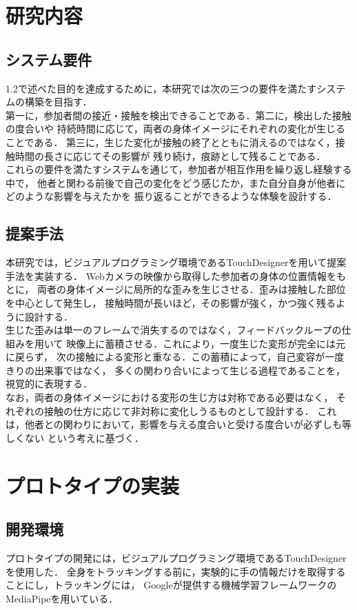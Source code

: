 \chapter{研究内容}
\label{chp:third}

\section{システム要件}

1.2で述べた目的を達成するために，本研究では次の三つの要件を満たすシステムの構築を目指す．\\
第一に，参加者間の接近・接触を検出できることである．第二に，検出した接触の度合いや
持続時間に応じて，両者の身体イメージにそれぞれの変化が生じることである．
第三に，生じた変化が接触の終了とともに消えるのではなく，接触時間の長さに応じてその影響が
残り続け，痕跡として残ることである．\\
これらの要件を満たすシステムを通じて，参加者が相互作用を繰り返し経験する中で，
他者と関わる前後で自己の変化をどう感じたか，また自分自身が他者にどのような影響を与えたかを
振り返ることができるような体験を設計する．

\section{提案手法}
本研究では，ビジュアルプログラミング環境であるTouchDesignerを用いて提案手法を実装する．
Webカメラの映像から取得した参加者の身体の位置情報をもとに，
両者の身体イメージに局所的な歪みを生じさせる．歪みは接触した部位を中心として発生し，
接触時間が長いほど，その影響が強く，かつ強く残るように設計する．\\
生じた歪みは単一のフレームで消失するのではなく，フィードバックループの仕組みを用いて
映像上に蓄積させる．これにより，一度生じた変形が完全には元に戻らず，
次の接触による変形と重なる．この蓄積によって，自己変容が一度きりの出来事ではなく，
多くの関わり合いによって生じる過程であることを，視覚的に表現する．\\
なお，両者の身体イメージにおける変形の生じ方は対称である必要はなく，
それぞれの接触の仕方に応じて非対称に変化しうるものとして設計する．
これは，他者との関わりにおいて，影響を与える度合いと受ける度合いが必ずしも等しくない
という考えに基づく．

\chapter{プロトタイプの実装}
\label{chp:force}

\section{開発環境}
プロトタイプの開発には，ビジュアルプログラミング環境であるTouchDesignerを使用した．
全身をトラッキングする前に，実験的に手の情報だけを取得することにし，トラッキングには，
Googleが提供する機械学習フレームワークのMediaPipeを用いている．

